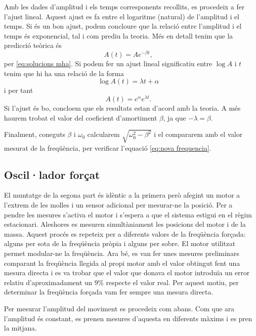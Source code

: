 \documentclass[12pt,a4paper]{article}
\begin{document}
Amb les dades d'amplitud i els temps corresponents recollits, es procedeix a fer l'ajust lineal. Aquest ajust es fa entre el logaritme (natural) de l'amplitud i el temps. Si és un bon ajust, podem concloure que la relació entre l'amplitud i el temps és exponencial, tal i com prediu la teoria. Més en detall tenim que la predicció teòrica és 
\begin{equation}
  A(t) = Ae^{-\beta t},
\end{equation}
per \ref{eq:solucions mha}. Si podem fer un ajust lineal significatiu entre \( \log{A} \) i \( t \) tenim que hi ha una relació de la forma
\begin{equation}
  \log{A(t)} = \lambda t + \alpha
\end{equation}
i per tant 
\begin{equation}
  A(t) = e^{\alpha}e^{\lambda t}.
\end{equation}
Si l'ajust és bo, concloem que els resultats estan d'acord amb la teoria. A més haurem trobat el valor del coeficient d'amortiment \( \beta \), ja que \( -\lambda = \beta \).

Finalment, coneguts \( \beta \) i \( \omega_0 \) calcularem \( \sqrt{\omega_0^2 - \beta^2} \) i el compararem amb el valor mesurat de la freqüència, per verificar l'equació \ref{eq:nova frequencia}.

\subsection{Oscil·lador forçat}
El muntatge de la segona part és idèntic a la primera però afegint un motor a l'extrem de les molles i un sensor adicional per mesurar-ne la posició. Per a pendre les mesures s'activa el motor i s'espera a que el sistema estigui en el règim estacionari. Aleshores es mesuren simultàniament les posicions del motor i de la massa. Aquest procés es repeteix per a diferents valors de la freqüència forçada: alguns per sota de la freqüència pròpia i alguns per sobre. El motor utilitzat permet modular-ne la freqüència. Ara bé, es van fer unes mesures preliminars comparant la freqüència llegida al propi motor amb el valor obtingut fent una mesura directa i es va trobar que el valor que donava el motor introduïa un error relatiu d'aproximadament un \( 9\% \) respecte el valor real. Per aquest motiu, per determinar la freqüència forçada vam fer sempre una mesura directa.

Per mesurar l'amplitud del moviment es procedeix com abans. Com que ara l'amplitud és constant, es prenen mesures d'aquesta en diferents màxims i es pren la mitjana.
\end{document}

